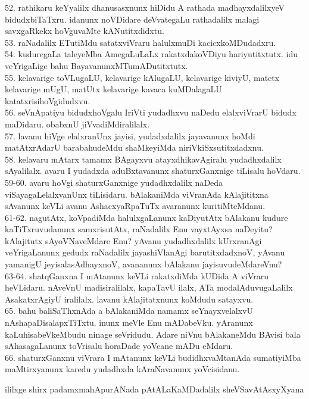 \documentclass{article}
\begin{document}
52. rathikaru keYyalilx dhanusasxnunx hiDidu A rathada madhayxdalilxyeV bidudxbiTaTxru. idanunx noVDidare deVvategaLu rathadalilx malagi savxgaRkekx hoVguvaMte kANutitxdidxtu.\\
53. raNadalilx ETutiMdu satatxviVraru halulxmuDi kacicxkoMDudadxru.\\
54. kuduregaLa taleyeMba AmegaLuLaLx rakatxdakoVDiyu hariyutitxtutx. idu veYrigaLige bahu BayavanunxMTumADutitxtutx.\\
55. kelavarige toVLugaLU, kelavarige kAlugaLU, kelavarige kiviyU, matetx kelavarige mUgU, matUtx kelavarige kavaca kuMDalagaLU katatxrisihoVgidudxvu.\\
56. seVnApatiyu bidudxhoVgalu IriVti yudadhxvu naDedu elalxviVrarU bidudx maDidaru. obabxnU jiVvadiMdiralilalx.\\
57. lavanu hiVge elalxranUnx jayisi, yudadxdalilx jayavanunx hoMdi matAtxrAdarU barabahudeMdu shaMkeyiMda niriVkiSxsutitxdadxnu.\\
58. kelavaru mAtarx tamamx BAgayxvu atayxdhikavAgiralu yudadhxdalilx sAyalilalx. avaru I yudadxda aduBxtavanunx shaturxGanxnige tiLisalu hoVdaru.\\
59-60. avaru hoVgi shaturxGanxnige yudadhxdalilx naDeda viSayagaLelalxvanUnx tiLisidaru. bAlakaniMda viVranAda kAlajititxna sAvanunx keVLi avanu AshacxyaRpaTuTx avaranunx kuritiMteMdanu.\\
61-62. nagutAtx, koVpadiMda halulxgaLanunx kaDiyutAtx bAlakanu kudure kaTiTxruvudanunx samxrisutAtx, raNadalilx Enu vayxtAyxsa naDeyitu? kAlajitutx sAyoVNaveMdare Enu? yAvanu yudadhxdalilx kUrxranAgi veYrigaLanunx gedudx raNadalilx jayashiVlanAgi barutitxdadxnoV, yAvanu yamanigU jeyisalasAdhayxnoV, avananunx bAlakanu jayisuvudeMdareVnu?\\
63-64. shatqGanxna I mAtanunx keVLi rakatxdiMda kUDida A viVraru heVLidaru. nAveVnU madisiralilalx, kapaTavU ilalx, ATa modalAduvugaLalilx AsakatxrAgiyU iralilalx. lavanu kAlajitatxnunx koMdudu satayxvu.\\
65. bahu baliSaThxnAda a bAlakaniMda namamx seYnayxvelalxvU nAshapaDisalapxTiTxtu. inunx meVle Enu mADabeVku. yAranunx kaLuhisabeVkeMbudu ninage seVridudu. Adare niVnu bAlakaneMdu BAvisi bala sAhasagaLanunx toVrisalu horaDade yoVcane mADu eMdaru.\\
66. shaturxGanxnu viVrara I mAtanunx keVLi budidhxvaMtanAda sumatiyiMba maMtirxyanunx karedu yudadhxda kAraNavanunx yoVcisidanu.\\

\begin{center}
ililxge shirx padamxmahApurANada pAtALaKaMDadalilx sheVSavAtAsxyXyana
\end{center}
\end{document}
